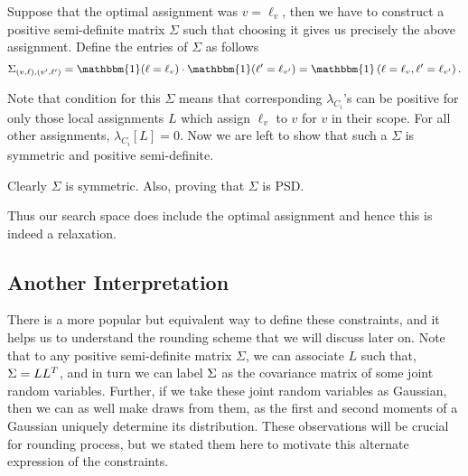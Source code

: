 Suppose that the optimal assignment was $v=\ell_v$, then we have to construct a positive semi-definite matrix $\Sigma$ such that choosing it gives us precisely the above assignment. 
Define the entries of $\Sigma$ as follows 
$$ \Sigma_{\lrb{v, \ell},\lrb{v', \ell'}} = \mathbbm{1}(\ell = \ell_v) \cdot \mathbbm{1}(\ell' = \ell_{v'}) = \mathbbm{1}\lrb{\ell = \ell_v, \ell'= \ell_{v'}}.$$ 

Note that \cite{lambdaandsigma} condition for this $\Sigma$ means that corresponding $\lambda_{C_i}$'s can be positive for only those local assignments $L$ which assign $\ell_v$ to $v$ for $v$ in their scope. 
For all other assignments, $\lambda_{C_i}[L]=0$.
Now we are left to show that such a $\Sigma$ is symmetric and positive semi-definite.

Clearly $\Sigma$ is symmetric. 
Also, 
proving that $\Sigma$ is PSD. 

 Thus our search space does include the optimal assignment and hence this is indeed a relaxation.

\subsection{Another Interpretation}

There is a more popular but equivalent way to define these constraints, and it helps us to understand the rounding scheme that we will discuss later on. 
Note that to any positive semi-definite matrix $\Sigma$, we can associate $L$ such that, $\Sigma = LL^T$, and in turn we can label $\Sigma$ as the covariance matrix of some joint random variables. 
Further, if we take these joint random variables as Gaussian, then we can as well make draws from them, as the first and second moments of a Gaussian  uniquely determine its distribution. 
These observations will be crucial for rounding process, but we stated them here to motivate this alternate expression of the constraints. 

